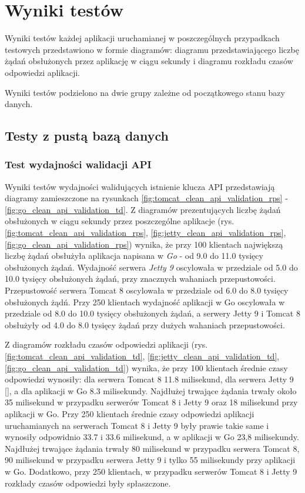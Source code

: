 \chapter{Wyniki testów}
Wyniki testów każdej aplikacji uruchamianej w poszczególnych przypadkach  testowych przedstawiono w formie diagramów: diagramu przedstawiającego liczbę żądań obsłużonych przez aplikację w ciągu sekundy i diagramu rozkładu czasów odpowiedzi aplikacji.

Wyniki testów podzielono na dwie grupy zależne od początkowego stanu bazy danych.

\section{Testy z pustą bazą danych}

\subsection{Test wydajności walidacji API}
Wyniki testów wydajności walidujących istnienie klucza API przedstawiają diagramy zamieszczone na rysunkach \ref{fig:tomcat_clean_api_validation_rps} - \ref{fig:go_clean_api_validation_td}. 
Z diagramów prezentujących liczbę żądań obsłużonych w ciągu sekundy przez poszczególne aplikacje (rys. \ref{fig:tomcat_clean_api_validation_rps}, \ref{fig:jetty_clean_api_validation_rps}, \ref{fig:go_clean_api_validation_rps}) wynika, że przy 100 klientach największą liczbę żądań obsłużyła aplikacja napisana w \textsl{Go} - od 9.0 do 11.0 tysięcy obsłużonych żądań. Wydajność serwera \textsl{Jetty 9} oscylowała w przedziale od 5.0 do 10.0 tysięcy obsłużonych żądań, przy znacznych wahaniach przepustowości. Przepustowość serwera Tomcat 8 oscylowała w przedziale od 6.0 do 8.0 tysięcy obsłużonych żądń.  Przy 250 klientach wydajność aplikacji w Go oscylowała w przedziale od 8.0 do 10.0 tysięcy obsłużonych żądań, a serwery Jetty 9 i Tomcat 8 obsłużyły od 4.0 do 8.0 tysięcy żądań przy dużych wahaniach przepustowości.      

Z diagramów rozkładu czasów odpowiedzi aplikacji (rys. \ref{fig:tomcat_clean_api_validation_td}, \ref{fig:jetty_clean_api_validation_td}, \ref{fig:go_clean_api_validation_td}) wynika, że przy 100 klientach średnie czasy odpowiedzi wynosiły: dla serwera Tomcat 8 11.8 milisekund, dla serwera Jetty 9 [], a dla aplikacji w Go 8.3 milisekundy. Najdłużej trwające żądania trwały około 35 milisekund w przypadku serwerów Tomcat 8 i Jetty 9 oraz 18 milisekund przy aplikacji w Go.  Przy 250 klientach średnie czasy odpowiedzi aplikacji uruchamianych na serwerach Tomcat 8 i Jetty 9 były prawie takie same i wynosiły odpowidnio 33.7 i 33.6 milisekund, a w aplikacji w Go 23,8 milisekundy. Najdłużej trwające żądania trwały 80 milisekund w przypadku serwera Tomcat 8, 90 milisekund w przypadku serwera Jetty 9 i tylko 55 milisekundy przy aplikacji w Go. Dodatkowo, przy 250 klientach, w przypadku serwerów Tomcat 8 i Jetty 9 rozkłady czasów odpowiedzi były spłaszczone. 

